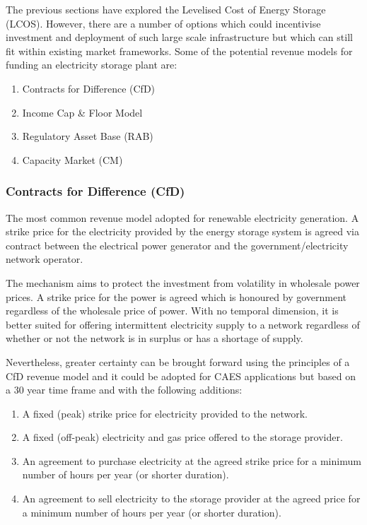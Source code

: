 \documentclass[preprint,12pt]{elsarticle}
\begin{document}
The previous sections have explored the Levelised Cost of Energy Storage (LCOS). However, there are a number of options which could incentivise investment and deployment of such large scale infrastructure but which can still fit within existing market frameworks. Some of the potential revenue models for funding an electricity storage plant are:

\begin{enumerate}
    \item Contracts for Difference (CfD)
    \item Income Cap \& Floor Model
    \item Regulatory Asset Base (RAB)
    \item Capacity Market (CM)
\end{enumerate}

\subsubsection{Contracts for Difference (CfD)}
The most common revenue model adopted for renewable electricity generation. A strike price for the electricity provided by the energy storage system is agreed via contract between the electrical power generator and the government/electricity network operator.

The mechanism aims to protect the investment from volatility in wholesale power prices. A strike price for the power is agreed which is honoured by government regardless of the wholesale price of power. With no temporal dimension, it is better suited for offering intermittent electricity supply to a network regardless of whether or not the network is in surplus or has a shortage of supply. 

Nevertheless, greater certainty can be brought forward using the principles of a CfD revenue model and it could be adopted for CAES applications but based on a 30 year time frame and with the following additions: 

\begin{enumerate}
    \item A fixed (peak) strike price for electricity provided to the network.
    \item A fixed (off-peak) electricity and gas price offered to the storage provider.
    \item An agreement to purchase electricity at the agreed strike price for a minimum number of hours per year (or shorter duration).
    \item An agreement to sell electricity to the storage provider at the agreed price for a minimum number of hours per year (or shorter duration).
\end{enumerate}
\end{document}
